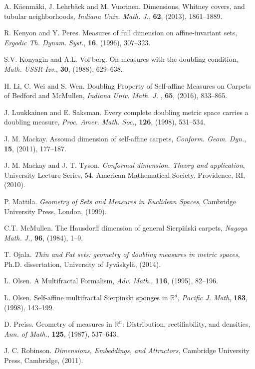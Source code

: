 \documentclass[12pt]{amsart}
\numberwithin{equation}{section}
\begin{document}
\begin{thebibliography}{99}
A. K{\"a}enm{\"a}ki, J. Lehrb{\"a}ck and M. Vuorinen.
Dimensions, Whitney covers, and tubular neighborhoods,
{\em Indiana Univ. Math. J.}, {\bf 62}, (2013), 1861–1889.

R. Kenyon and Y. Peres.
Measures of full dimension on affine-invariant sets,
\emph{Ergodic Th. Dynam. Syst.}, {\bf 16}, (1996), 307--323.

S.V. Konyagin and A.L. Vol'berg.
On measures with the doubling condition, \emph{Math. USSR-Izv.}, \textbf{30}, (1988), 629--638.

H. Li, C. Wei and S. Wen.
Doubling Property of Self-affine Measures on Carpets of Bedford and McMullen,
 \emph{Indiana Univ. Math. J. }, {\bf 65}, (2016),  833--865.


J. Luukkainen and E. Saksman.
Every complete doubling metric space carries a doubling measure, \emph{Proc. Amer. Math. Soc.}, \textbf{126}, (1998), 531--534.

J. M. Mackay.
Assouad dimension of self-affine carpets,
\emph{Conform. Geom. Dyn.}, {\bf 15}, (2011), 177--187.

J. M. Mackay and J. T. Tyson.
\emph{Conformal dimension. Theory and application},
University Lecture Series, 54. American Mathematical Society, Providence, RI, (2010).

P. Mattila.
{\em Geometry of Sets and Measures in Euclidean Spaces},
Cambridge University Press, London, (1999).

C.T. McMullen.
The Hausdorff dimension of general Sierpi\'nski carpets,
{\em Nagoya Math. J.}, {\bf 96}, (1984), 1--9.


T. Ojala.
{\em Thin and Fat sets: geometry of doubling measures in metric spaces},
Ph.D. dissertation, University of Jyväskylä, (2014).



L. Olsen.
A Multifractal Formalism,
\emph{Adv. Math.}, {\bf 116}, (1995), 82--196.

L. Olsen.
Self-affine multifractal Sierpinski sponges in $\mathbb{R}^d$,
{\em Pacific J. Math}, {\bf 183}, (1998), 143--199.

D. Preiss.
Geometry of measures in $\mathbb{R}^n$: Distribution, rectifiability, and densities,
{\em Ann. of Math.}, {\bf  125},  (1987), 537--643.

J. C. Robinson.
{\em Dimensions, Embeddings, and Attractors},
Cambridge University Press, Cambridge, (2011).




\end{thebibliography}
\end{document}
